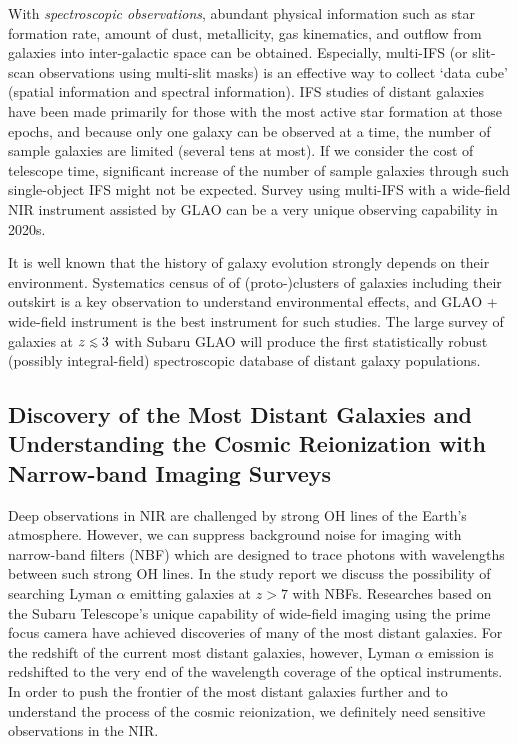 With {\it spectroscopic observations}, abundant physical information
such as star formation rate, amount of dust, metallicity, gas
kinematics, and outflow from galaxies into inter-galactic space can be
obtained.
Especially, multi-IFS (or slit-scan observations using multi-slit masks)
is an effective way to collect `data cube' (spatial information and
spectral information). IFS studies of distant galaxies have been made 
primarily for those with the most active star formation at those
epochs, and because only one galaxy can be observed at a time, the
number of sample galaxies are limited (several tens at most). If we
consider the cost of telescope time, significant increase of the number
of sample galaxies through such single-object IFS might not be
expected. Survey using multi-IFS with a wide-field NIR instrument
assisted by GLAO can be a very unique observing capability in 2020s. 

It is well known that the history of galaxy evolution strongly depends
on their environment. Systematics census of of (proto-)clusters of
galaxies including their outskirt is a key observation to understand
environmental effects, and GLAO + wide-field instrument is the best
instrument for such studies. 
The large survey of galaxies at $z\lsim 3$ with Subaru GLAO will produce
the first statistically robust (possibly integral-field) spectroscopic
database of distant galaxy populations.


\subsection{Discovery of the Most Distant Galaxies and Understanding the
  Cosmic Reionization with Narrow-band Imaging Surveys}

Deep observations in NIR are challenged by strong OH lines of
the Earth's atmosphere. However, we can suppress background noise for
imaging with narrow-band filters (NBF) which are designed to trace
photons with wavelengths between such strong OH lines. 
In the study report
we discuss the possibility of searching Lyman
$\alpha$ emitting galaxies at $z>7$ with NBFs.
Researches based on the Subaru Telescope's unique capability of
wide-field imaging using the prime focus camera have achieved
discoveries of many of the most distant galaxies. For the redshift of
the current most distant galaxies, however, Lyman $\alpha$ emission is
redshifted to the very end of the wavelength coverage of the optical
instruments. In order to push the frontier of the most distant galaxies
further and to understand the process of the cosmic reionization, we
definitely need sensitive observations in the NIR.

